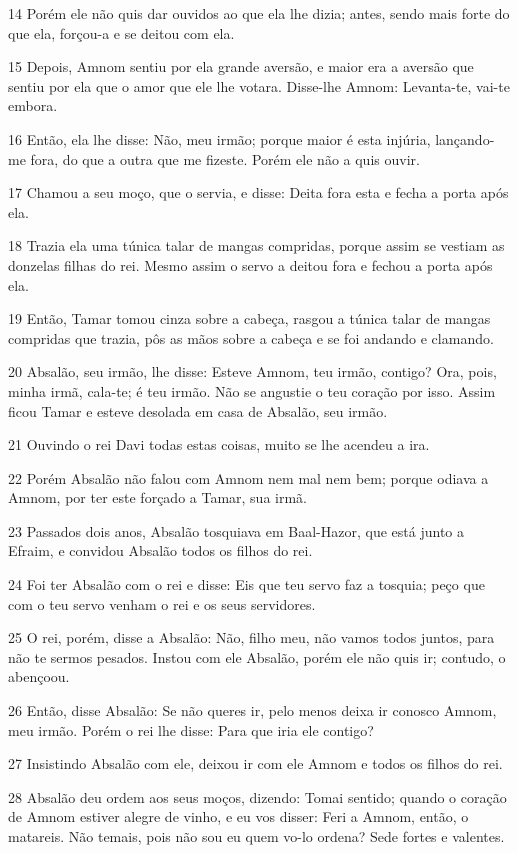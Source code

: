 \par 14 Porém ele não quis dar ouvidos ao que ela lhe dizia; antes, sendo mais forte do que ela, forçou-a e se deitou com ela.
\par 15 Depois, Amnom sentiu por ela grande aversão, e maior era a aversão que sentiu por ela que o amor que ele lhe votara. Disse-lhe Amnom: Levanta-te, vai-te embora.
\par 16 Então, ela lhe disse: Não, meu irmão; porque maior é esta injúria, lançando-me fora, do que a outra que me fizeste. Porém ele não a quis ouvir.
\par 17 Chamou a seu moço, que o servia, e disse: Deita fora esta e fecha a porta após ela.
\par 18 Trazia ela uma túnica talar de mangas compridas, porque assim se vestiam as donzelas filhas do rei. Mesmo assim o servo a deitou fora e fechou a porta após ela.
\par 19 Então, Tamar tomou cinza sobre a cabeça, rasgou a túnica talar de mangas compridas que trazia, pôs as mãos sobre a cabeça e se foi andando e clamando.
\par 20 Absalão, seu irmão, lhe disse: Esteve Amnom, teu irmão, contigo? Ora, pois, minha irmã, cala-te; é teu irmão. Não se angustie o teu coração por isso. Assim ficou Tamar e esteve desolada em casa de Absalão, seu irmão.
\par 21 Ouvindo o rei Davi todas estas coisas, muito se lhe acendeu a ira.
\par 22 Porém Absalão não falou com Amnom nem mal nem bem; porque odiava a Amnom, por ter este forçado a Tamar, sua irmã.
\par 23 Passados dois anos, Absalão tosquiava em Baal-Hazor, que está junto a Efraim, e convidou Absalão todos os filhos do rei.
\par 24 Foi ter Absalão com o rei e disse: Eis que teu servo faz a tosquia; peço que com o teu servo venham o rei e os seus servidores.
\par 25 O rei, porém, disse a Absalão: Não, filho meu, não vamos todos juntos, para não te sermos pesados. Instou com ele Absalão, porém ele não quis ir; contudo, o abençoou.
\par 26 Então, disse Absalão: Se não queres ir, pelo menos deixa ir conosco Amnom, meu irmão. Porém o rei lhe disse: Para que iria ele contigo?
\par 27 Insistindo Absalão com ele, deixou ir com ele Amnom e todos os filhos do rei.
\par 28 Absalão deu ordem aos seus moços, dizendo: Tomai sentido; quando o coração de Amnom estiver alegre de vinho, e eu vos disser: Feri a Amnom, então, o matareis. Não temais, pois não sou eu quem vo-lo ordena? Sede fortes e valentes.
